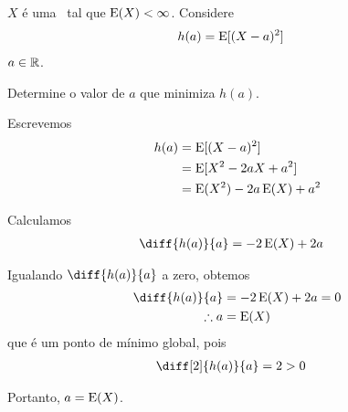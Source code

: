 \begin{example}
    $X$ é uma \va\ tal que $\operatorname{E}(X) < \infty$.
    Considere
    \begin{align*}
        h(a) &= \operatorname{E}[(X-a)^2]
    \end{align*}
    $a \in \operatorname{\mathbb{R}}$.

    Determine o valor de $a$ que minimiza $h(a)$.

    \bigskip
    Escrevemos
    \begin{align*}
        h(a) &= \operatorname{E}[(X-a)^2] \\
        &= \operatorname{E}[X^2-2aX+a^2] \\
        &= \operatorname{E}(X^2)-2a\operatorname{E}(X)+a^2
    \end{align*}

    Calculamos
    \begin{align*}
        \diff{h(a)}{a} &= -2\Expected(X)+2a
    \end{align*}
    
    Igualando $\diff{h(a)}{a}$ a zero, obtemos
    \begin{align*}
        \diff{h(a)}{a} &= -2\Expected(X)+2a = 0 \\
        \therefore a &= \Expected(X)
    \end{align*}
    que é um ponto de mínimo global, pois
    \begin{align*}
        \diff[2]{h(a)}{a} &= 2 > 0
    \end{align*}

    Portanto, $a = \operatorname{E}(X)$.
\end{example}